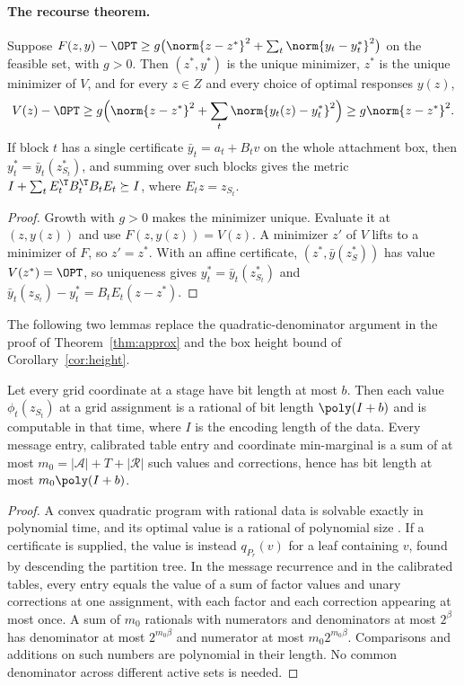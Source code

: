 \paragraph{The recourse theorem.}

\begin{lemma}\label{lem:cv-growth}
Suppose $F(z,y)-\OPT\ge g\bigl(\norm{z-z^*}^2+\sum_t\norm{y_t-y_t^*}^2\bigr)$ on
the feasible set, with $g>0$. Then $(z^*,y^*)$ is the unique minimizer, $z^*$
is the unique minimizer of $V$, and for every $z\in Z$ and every choice of
optimal responses $y(z)$,
\[
V(z)-\OPT\ge g\Bigl(\norm{z-z^*}^2+\sum_t\norm{y_t(z)-y_t^*}^2\Bigr)
\ge g\norm{z-z^*}^2.
\]
If block $t$ has a single certificate $\bar y_t=a_t+B_tv$ on the whole
attachment box, then $y_t^*=\bar y_t(z^*_{S_t})$, and summing over such blocks
gives the metric $I+\sum_tE_t^{\T}B_t^{\T}B_tE_t\succeq I$, where
$E_tz=z_{S_t}$.
\end{lemma}

\begin{proof}
Growth with $g>0$ makes the minimizer unique. Evaluate it at $(z,y(z))$ and use
$F(z,y(z))=V(z)$. A minimizer $z'$ of $V$ lifts to a minimizer of $F$, so
$z'=z^*$. With an affine certificate, $(z^*,\bar y(z^*_{S}))$ has value
$V(z^*)=\OPT$, so uniqueness gives $y_t^*=\bar y_t(z^*_{S_t})$ and
$\bar y_t(z_{S_t})-y_t^*=B_tE_t(z-z^*)$.
\end{proof}

The following two lemmas replace the quadratic-denominator argument in the
proof of Theorem~\ref{thm:approx} and the box height bound of
Corollary~\ref{cor:height}.

\begin{lemma}\label{lem:cv-bits}
Let every grid coordinate at a stage have bit length at most $b$. Then each
value $\phi_t(z_{S_t})$ at a grid assignment is a rational of bit length
$\poly(I+b)$ and is computable in that time, where $I$ is the encoding length
of the data. Every message entry, calibrated table entry and coordinate
min-marginal is a sum of at most $m_0=|\mathcal A|+T+|\mathcal R|$ such values
and corrections, hence has bit length at most $m_0\poly(I+b)$.
\end{lemma}

\begin{proof}
A convex quadratic program with rational data is solvable exactly in
polynomial time, and its optimal value is a rational of polynomial size
\cite{KozlovTarasovKhachiyan1980}. If a certificate is supplied, the value is
instead $q_{P_r}(v)$ for a leaf containing $v$, found by descending the
partition tree. In the message recurrence and in the calibrated tables, every
entry equals the value of a sum of factor values and unary corrections at one
assignment, with each factor and each correction appearing at most once. A
sum of $m_0$ rationals with numerators and denominators at most $2^{\beta}$
has denominator at most $2^{m_0\beta}$ and numerator at most
$m_0 2^{m_0\beta}$. Comparisons and additions on such numbers are polynomial in
their length. No common denominator across different active sets is needed.
\end{proof}

